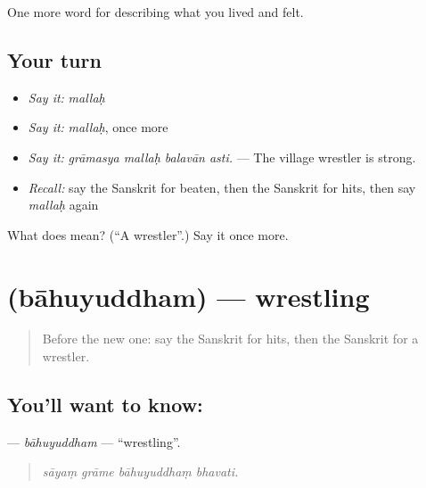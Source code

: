 \begin{grammarlens}[title={What you've built}]
One more word for describing what you lived and felt.
\end{grammarlens}

\subsection*{Your turn}
\begin{itemize}
\raggedright
  \item \emph{Say it:} \emph{mallaḥ}
  \item \emph{Say it:} \emph{mallaḥ}, once more
  \item \emph{Say it:} \emph{grāmasya mallaḥ balavān asti.} — The village wrestler is strong.
  \item \emph{Recall:} say the Sanskrit for beaten, then the Sanskrit for hits, then say \emph{mallaḥ} again
\end{itemize}

\begin{tcolorbox}[breakable,colback=teal!4,colframe=teal!35!black,title={Before you move on}]
What does  mean? (\textquotedblleft{}A wrestler\textquotedblright{}.) Say it once more.
\end{tcolorbox}
\section[\texorpdfstring{\sk{बाहुयुद्धम्} (bāhuyuddham)}{बाहुयुद्धम् (bāhuyuddham)}]{ (bāhuyuddham) — wrestling}

\label{lesson:SA-C525-bahuyuddham}



\begin{quote}
Before the new one: say the Sanskrit for hits, then the Sanskrit for a wrestler.
\end{quote}

\subsection*{You'll want to know: }
\textbf{} — \emph{bāhuyuddham} — \textquotedblleft{}wrestling\textquotedblright{}.

\begin{quote}
   
\end{quote}

\begin{quote}
\emph{sāyaṃ grāme bāhuyuddhaṃ bhavati.}
\end{quote}

